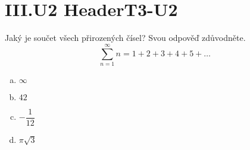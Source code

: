 \documentclass{../../../../style/mkimain}
\begin{document}
\section*{III.U2 HeaderT3-U2}
\noindent Jaký je součet všech přirozených čísel? Svou odpověď zdůvodněte.
$$
\sum_{n=1}^{\infty}n=1+2+3+4+5+\dots
$$
\begin{enumerate}[a)]
    \item $\infty$
    \item $42$
    \item $-\dfrac{1}{12}$
    \item $\pi\sqrt{3}$
\end{enumerate}
\end{document}
